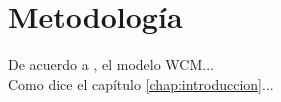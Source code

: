 \chapter{Metodología}
\label{chap:metodologia}

 De acuerdo a \cite{Barrett2009}, el modelo WCM...\\

 
 
  Como dice el capítulo \ref{chap:introduccion}...




